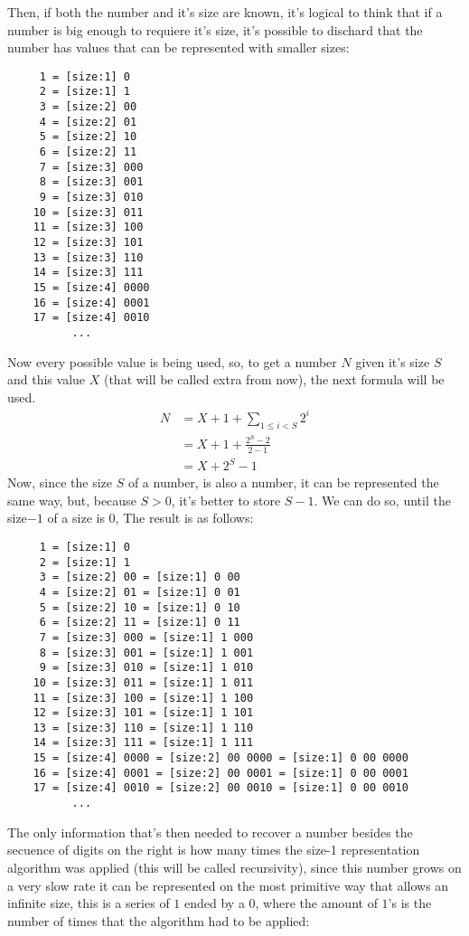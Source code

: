 \documentclass[a4paper,11pt]{article}
\begin{document}
Then, if both the number and it's size are known, it's logical to think that if a number is big enough to requiere it's size, it's possible to dischard that the number has values that can be represented with smaller sizes:
\begin{center} \begin{lstlisting}
	 1 = [size:1] 0
	 2 = [size:1] 1
	 3 = [size:2] 00
	 4 = [size:2] 01
	 5 = [size:2] 10
	 6 = [size:2] 11
	 7 = [size:3] 000
	 8 = [size:3] 001
	 9 = [size:3] 010
	10 = [size:3] 011
	11 = [size:3] 100
	12 = [size:3] 101
	13 = [size:3] 110
	14 = [size:3] 111
	15 = [size:4] 0000
	16 = [size:4] 0001
	17 = [size:4] 0010
	      ...
\end{lstlisting} \end{center}
Now every possible value is being used, so, to get a number $N$ given it's size $S$ and this value $X$ (that will be called extra from now), the next formula will be used.
\begin{align*}
	N&= X +1 + \sum_{1\leq i < S}{2^i} \\
	&= X+1+ \frac{2^{S}-2}{2-1} \\
	&= X+2^{S}-1
\end{align*}
Now, since the size $S$ of a number, is also a number, it can be represented the same way, but, because $S>0$, it's better to store $S-1$. We can do so, until the size$-1$ of a size is $0$, The result is as follows:
\begin{center} \begin{lstlisting}
	 1 = [size:1] 0
	 2 = [size:1] 1
	 3 = [size:2] 00 = [size:1] 0 00
	 4 = [size:2] 01 = [size:1] 0 01
	 5 = [size:2] 10 = [size:1] 0 10
	 6 = [size:2] 11 = [size:1] 0 11
	 7 = [size:3] 000 = [size:1] 1 000
	 8 = [size:3] 001 = [size:1] 1 001
	 9 = [size:3] 010 = [size:1] 1 010
	10 = [size:3] 011 = [size:1] 1 011
	11 = [size:3] 100 = [size:1] 1 100
	12 = [size:3] 101 = [size:1] 1 101
	13 = [size:3] 110 = [size:1] 1 110
	14 = [size:3] 111 = [size:1] 1 111
	15 = [size:4] 0000 = [size:2] 00 0000 = [size:1] 0 00 0000
	16 = [size:4] 0001 = [size:2] 00 0001 = [size:1] 0 00 0001
	17 = [size:4] 0010 = [size:2] 00 0010 = [size:1] 0 00 0010
	      ...	
\end{lstlisting} \end{center}
The only information that's then needed to recover a number besides the secuence of digits on the right is how many times the size-1 representation algorithm was applied (this will be called recursivity), since this number grows on a very slow rate it can be represented on the most primitive way that allows an infinite size, this is a series of $1$ ended by a $0$, where the amount of $1$'s is the number of times that the algorithm had to be applied:
\end{document}
